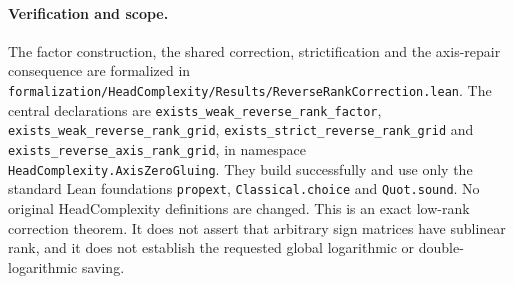 \documentclass[11pt]{article}
\begin{document}
\paragraph{Verification and scope.}
The factor construction, the shared correction, strictification and
the axis-repair consequence are formalized in
\texttt{formalization/HeadComplexity/Results/ReverseRankCorrection.lean}.
The central declarations are
\texttt{exists\_weak\_reverse\_rank\_factor},
\texttt{exists\_weak\_reverse\_rank\_grid},
\texttt{exists\_strict\_reverse\_rank\_grid} and
\texttt{exists\_reverse\_axis\_rank\_grid}, in namespace
\texttt{HeadComplexity.AxisZeroGluing}.
They build successfully and use only the standard Lean foundations
\texttt{propext}, \texttt{Classical.choice} and \texttt{Quot.sound}.
No original HeadComplexity definitions are changed.
This is an exact low-rank correction theorem. It does not assert that
arbitrary sign matrices have sublinear rank, and it does not establish
the requested global logarithmic or double-logarithmic saving.
\end{document}
